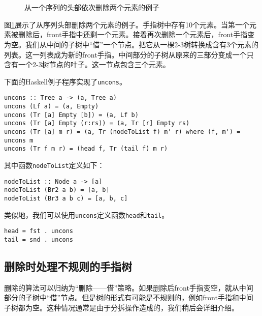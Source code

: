 \documentclass[UTF8]{article}
\begin{document}
\begin{figure}[htbp]
  \centering
   \\
   \\
  \caption{从一个序列的头部依次删除两个元素的例子} \label{fig:ftr-uncons-example}
\end{figure}

图\ref{fig:ftr-uncons-example}展示了从序列头部删除两个元素的例子。手指树中存有10个元素。当第一个元素被删除后，front手指中还剩一个元素。接着再次删除一个元素后，front手指变为空。我们从中间的子树中“借”一个节点。把它从一棵2-3树转换成含有3个元素的列表。这一列表成为新的front手指。中间部分的子树从原来的三部分变成一个只含有一个2-3树节点的叶子。这一节点包含三个元素。

下面的Haskell例子程序实现了\texttt{uncons}。

\lstset{language=Haskell}
\begin{lstlisting}[style=Haskell]
uncons :: Tree a -> (a, Tree a)
uncons (Lf a) = (a, Empty)
uncons (Tr [a] Empty [b]) = (a, Lf b)
uncons (Tr [a] Empty (r:rs)) = (a, Tr [r] Empty rs)
uncons (Tr [a] m r) = (a, Tr (nodeToList f) m' r) where (f, m') = uncons m
uncons (Tr f m r) = (head f, Tr (tail f) m r)
\end{lstlisting}

其中函数\texttt{nodeToList}定义如下：

\begin{lstlisting}[style=Haskell]
nodeToList :: Node a -> [a]
nodeToList (Br2 a b) = [a, b]
nodeToList (Br3 a b c) = [a, b, c]
\end{lstlisting}

类似地，我们可以使用\texttt{uncons}定义函数\texttt{head}和\texttt{tail}。

\begin{lstlisting}[style=Haskell]
head = fst . uncons
tail = snd . uncons
\end{lstlisting}

\subsection{删除时处理不规则的手指树}
删除的算法可以归纳为“删除——借”策略。如果删除后front手指变空，就从中间部分的子树中“借”节点。但是树的形式有可能是不规则的，例如front手指和中间子树都为空。这种情况通常是由于分拆操作造成的，我们稍后会详细介绍。
\end{document}
